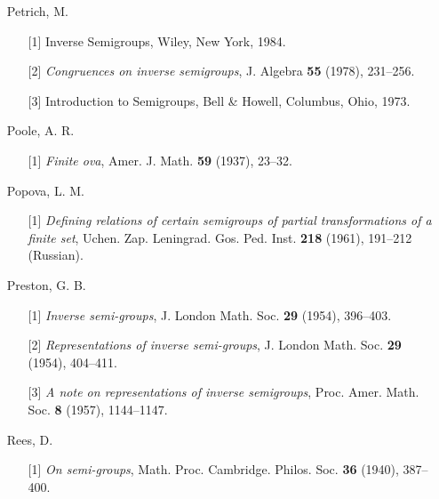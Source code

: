 \documentclass{surv-l}
\numberwithin{equation}{section}
\numberwithin{table}{section}
\numberwithin{figure}{section}
\theoremstyle{definition}
\begin{document}
\begin{enumerate}
\item[] Petrich, M.
\begin{enumerate}
\item[\hypertarget{bib60}{[1]}] Inverse Semigroups, Wiley, New York, 1984.

\item[\hypertarget{bib60a}{[2]}] \emph{Congruences on inverse semigroups}, J. Algebra
\textbf{55} (1978), 231--256.

\item[\hypertarget{bib60b}{[3]}] Introduction to Semigroups, Bell \& Howell, Columbus,
Ohio, 1973.
\end{enumerate}

\item[] Poole, A. R.
\begin{enumerate}
\item[\hypertarget{bib61}{[1]}] \emph{Finite ova}, Amer. J. Math. \textbf{59} (1937), 23--32.
\end{enumerate}

\item[] Popova, L. M.
\begin{enumerate}
\item[\hypertarget{bib62}{[1]}] \emph{Defining relations of certain semigroups of
partial transformations of a finite set}, Uchen. Zap.
Leningrad. Gos. Ped. Inst. \textbf{218} (1961), 191--212
(Russian).
\end{enumerate}

\item[] Preston, G. B.
\begin{enumerate}
\item[\hypertarget{bib63}{[1]}] \emph{Inverse semi-groups}, J. London Math. Soc. \textbf{29}
(1954), 396--403.

\item[\hypertarget{bib63a}{[2]}] \emph{Representations of inverse semi-groups}, J.
London Math. Soc. \textbf{29} (1954), 404--411.

\item[\hypertarget{bib63b}{[3]}] \emph{A note on representations of inverse
semigroups}, Proc. Amer. Math. Soc. \textbf{8} (1957),
1144--1147.
\end{enumerate}

\item[] Rees, D.
\begin{enumerate}
\item[\hypertarget{bib23}{[1]}] \emph{On semi-groups}, Math. Proc. Cambridge. Philos.
Soc. \textbf{36} (1940), 387--400.
\end{enumerate}


\end{enumerate}
\end{document}
